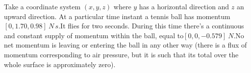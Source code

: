 \documentclass[a4paper,12pt,%
onecolumn,oneside,%
british%
]{memoir}
\renewcommand*{\|}[1][]{\nonscript\:#1\vert\nonscript\:\mathopen{}}
\begin{document}
Take a coordinate system $(x,y,z)$ where $y$ has a horizontal direction and $z$ an upward direction. At a particular time instant a tennis ball has momentum\enspace$[0,\num{1.70},\num{0.98}]\:\unit{N\,s}$.\enspace It flies for two seconds.
%
During this time there's a continuous and constant supply of momentum within the ball, equal to\enspace$[0,0,-\num{0.579}]\:\unit{N}$.\enspace No net momentum is leaving or entering the ball in any other way (there is a flux of momentum corresponding to air pressure, but it is such that its total over the whole surface is approximately zero).
\end{document}
